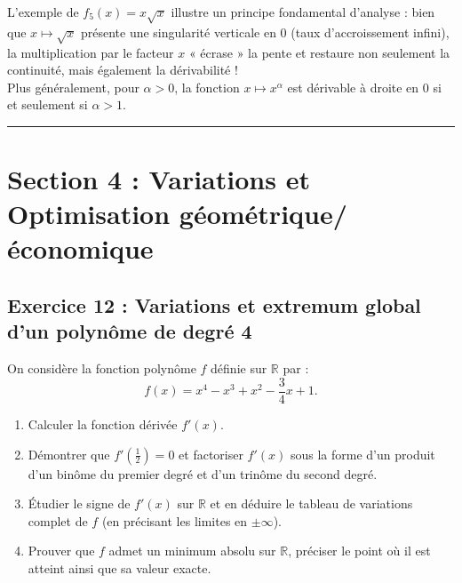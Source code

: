 \documentclass[11pt,a4paper]{article}
\newcommand{\R}{\mathbb{R}}
\begin{document}
\begin{remarquabox}
L'exemple de $f_5(x) = x\sqrt{x}$ illustre un principe fondamental d'analyse : bien que $x \mapsto \sqrt{x}$ présente une singularité verticale en $0$ (taux d'accroissement infini), la multiplication par le facteur $x$ « écrase » la pente et restaure non seulement la continuité, mais également la dérivabilité !\\
Plus généralement, pour $\alpha > 0$, la fonction $x \mapsto x^\alpha$ est dérivable à droite en $0$ si et seulement si $\alpha > 1$.
\end{remarquabox}


\vspace{1cm}
\hrule
\vspace{1cm}
\section{Section 4 : Variations et Optimisation géométrique/économique}

\subsection*{Exercice 12 : Variations et extremum global d'un polynôme de degré 4}

On considère la fonction polynôme $f$ définie sur $\R$ par :
\[
f(x) = x^4 - x^3 + x^2 - \frac{3}{4}x + 1.
\]
\begin{enumerate}[label=\textbf{\arabic*.}]
    \item Calculer la fonction dérivée $f'(x)$.
    \item Démontrer que $f'\left(\frac{1}{2}\right) = 0$ et factoriser $f'(x)$ sous la forme d'un produit d'un binôme du premier degré et d'un trinôme du second degré.
    \item Étudier le signe de $f'(x)$ sur $\R$ et en déduire le tableau de variations complet de $f$ (en précisant les limites en $\pm\infty$).
    \item Prouver que $f$ admet un minimum absolu sur $\R$, préciser le point où il est atteint ainsi que sa valeur exacte.
\end{enumerate}
\end{document}
